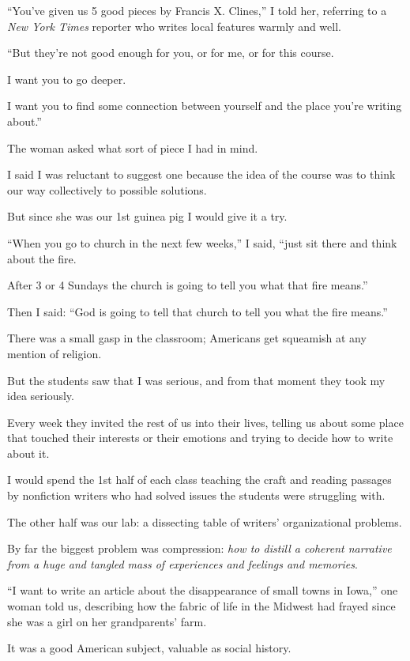 \documentclass{book}
\numberwithin{equation}{section}
\begin{document}
``You've given us 5 good pieces by Francis X. Clines,'' I told her, referring to a \textit{New York Times} reporter who writes local features warmly and well.

``But they're not good enough for you, or for me, or for this course.

I want you to go deeper.

I want you to find some connection between yourself and the place you're writing about.''

%
The woman asked what sort of piece I had in mind.

I said I was reluctant to suggest one because the idea of the course was to think our way collectively to possible solutions.

But since she was our 1st guinea pig I would give it a try.

``When you go to church in the next few weeks,'' I said, ``just sit there and think about the fire.

After 3 or 4 Sundays the church is going to tell you what that fire means.''

Then I said: ``God is going to tell that church to tell you what the fire means.''

%
There was a small gasp in the classroom; Americans get squeamish at any mention of religion.

But the students saw that I was serious, and from that moment they took my idea seriously.

Every week they invited the rest of us into their lives, telling us about some place that touched their interests or their emotions and trying to decide how to write about it.

I would spend the 1st half of each class teaching the craft and reading passages by nonfiction writers who had solved issues the students were struggling with.

The other half was our lab: a dissecting table of writers' organizational problems.

%
By far the biggest problem was compression: \textit{how to distill a coherent narrative from a huge and tangled mass of experiences and feelings and memories}.

``I want to write an article about the disappearance of small towns in Iowa,'' one woman told us, describing how the fabric of life in the Midwest had frayed since she was a girl on her grandparents' farm.

It was a good American subject, valuable as social history.
\end{document}
